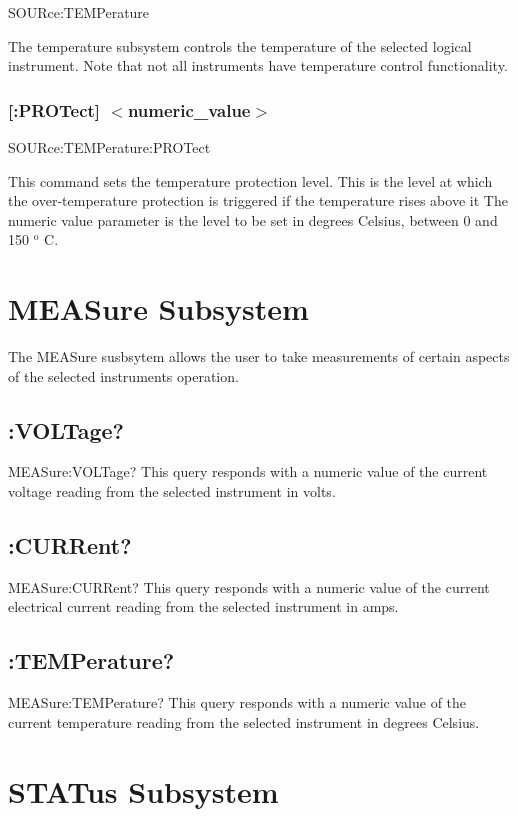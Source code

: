 {\ttfamily S\-O\-U\-Rce\-:T\-E\-M\-Perature}\par
 The temperature subsystem controls the temperature of the selected logical instrument. Note that not all instruments have temperature control functionality.\hypertarget{a00002_sourtempprot}{}\subsubsection{\mbox{[}\-:\-P\-R\-O\-Tect\mbox{]} $<$numeric\-\_\-value$>$}\label{a00002_sourtempprot}
{\ttfamily S\-O\-U\-Rce\-:\-T\-E\-M\-Perature\-:P\-R\-O\-Tect}\par
 This command sets the temperature protection level. This is the level at which the over-\/temperature protection is triggered if the temperature rises above it The numeric value parameter is the level to be set in degrees Celsius, between 0 and 150 $^{\mbox{o}}$ C.\hypertarget{a00002_meas}{}\section{M\-E\-A\-Sure Subsystem}\label{a00002_meas}
The M\-E\-A\-Sure susbsytem allows the user to take measurements of certain aspects of the selected instruments operation.\hypertarget{a00002_measvolt}{}\subsection{\-:\-V\-O\-L\-Tage?}\label{a00002_measvolt}
{\ttfamily M\-E\-A\-Sure\-:V\-O\-L\-Tage?} This query responds with a numeric value of the current voltage reading from the selected instrument in volts.\hypertarget{a00002_meascurr}{}\subsection{\-:\-C\-U\-R\-Rent?}\label{a00002_meascurr}
{\ttfamily M\-E\-A\-Sure\-:C\-U\-R\-Rent?} This query responds with a numeric value of the current electrical current reading from the selected instrument in amps.\hypertarget{a00002_meastemp}{}\subsection{\-:\-T\-E\-M\-Perature?}\label{a00002_meastemp}
{\ttfamily M\-E\-A\-Sure\-:T\-E\-M\-Perature?} This query responds with a numeric value of the current temperature reading from the selected instrument in degrees Celsius.\hypertarget{a00002_stat}{}\section{S\-T\-A\-Tus Subsystem}\label{a00002_stat}
